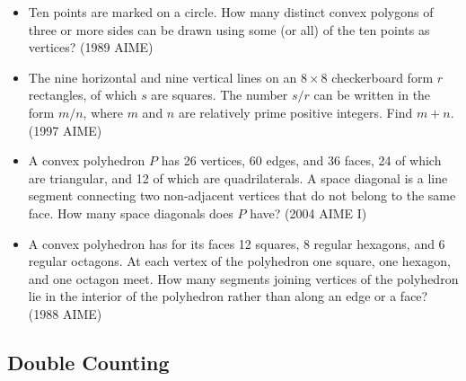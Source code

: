 \documentclass{article}
\begin{document}
\begin{itemize}
\item Ten points are marked on a circle. How many distinct convex polygons of three or more sides can be drawn using some (or all) of the ten points as vertices? (1989 AIME)

\item The nine horizontal and nine vertical lines on an $8\times 8$ checkerboard form $r$ rectangles, of which $s$ are squares. The number $s/r$ can be written in the form $m/n$, where $m$ and $n$ are relatively prime positive integers. Find $m+n$. (1997 AIME)

\item A convex polyhedron $P$ has 26 vertices, 60 edges, and 36 faces, 24 of which are triangular, and 12 of which are quadrilaterals. A space diagonal is a line segment connecting two non-adjacent vertices that do not belong to the same face. How many space diagonals does $P$ have? (2004 AIME I)

\item A convex polyhedron has for its faces 12 squares, 8 regular hexagons, and 6 regular octagons. At each vertex of the polyhedron one square, one hexagon, and one octagon meet. How many segments joining vertices of the polyhedron lie in the interior of the polyhedron rather than along an edge or a face? (1988 AIME)

\end{itemize}


\subsection{Double Counting}
\end{document}
